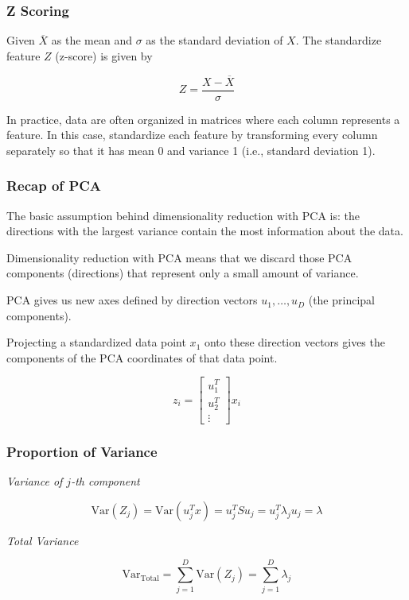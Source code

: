 \subsubsection{Z Scoring}

Given \(\overline{X}\) as the mean and \(\sigma\) as the standard deviation of \(X\). The standardize feature 
\(Z\) (z-score) is given by 

\[
    Z = \frac{X - \overline{X}}{\sigma}
\]

In practice, data are often organized in matrices where each column represents a feature.
In this case, standardize each feature by transforming every column separately so that it has mean 0 and variance 1 (i.e., standard deviation 1).

\subsubsection{Recap of PCA}

The basic assumption behind dimensionality reduction with PCA is: the directions with the largest variance 
contain the most information about the data.

Dimensionality reduction with PCA means that we discard those PCA components (directions) that represent only a 
small amount of variance.

PCA gives us new axes defined by direction vectors \(u_1, \dots, u_D\) (the principal components).

Projecting a standardized data point \(x_1\) onto these direction vectors gives the components of the 
PCA coordinates of that data point.

\[
    z_i = 
    \begin{bmatrix}
        u_1^T \\ 
        u_2^T \\ 
        \vdots
    \end{bmatrix}
    x_i
\]

\subsubsection{Proportion of Variance}

\emph{Variance of \(j\)-th component} 

\[
    \mathrm{Var}(Z_j) = \mathrm{Var}(u_j^T x) = u_j^T S u_j = u_j^T \lambda_j u_j = \lambda
\]

\emph{Total Variance } 

\[
    \mathrm{Var}_{\text{Total}} = \sum_{j = 1}^{D} \mathrm{Var}(Z_j) = \sum_{j = 1}^{D} \lambda_j
\]


